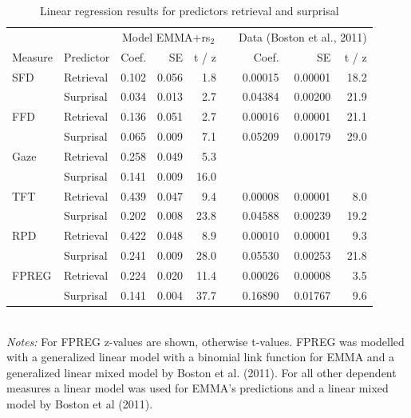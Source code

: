 \begin{subappendices}
\begin{table}
\caption{Linear regression results for predictors retrieval and surprisal} \label{lmtable}
\begin{tabular}{llrrrlrrr}
 & & \multicolumn{3}{c}{Model EMMA+rs$_2$} & & \multicolumn{3}{c}{Data (Boston et al., 2011)}  \\ \cline{3-5} \cline{7-9}
Measure & Predictor & Coef. & SE & t  / z &   & Coef. & SE & t / z \\ 
SFD & Retrieval & 0.102 & 0.056 & 1.8 &   & 0.00015 & 0.00001 & 18.2 \\ 
    & Surprisal & 0.034 & 0.013 & 2.7 &   & 0.04384 & 0.00200 & 21.9 \\ 
  FFD & Retrieval & 0.136 & 0.051 & 2.7 &   & 0.00016 & 0.00001 & 21.1 \\ 
    & Surprisal & 0.065 & 0.009 & 7.1 &   & 0.05209 & 0.00179 & 29.0 \\ 
  Gaze & Retrieval & 0.258 & 0.049 & 5.3 &   &  &  &  \\ 
    & Surprisal & 0.141 & 0.009 & 16.0 &   &  &  &  \\ 
  TFT & Retrieval & 0.439 & 0.047 & 9.4 &   & 0.00008 & 0.00001 & 8.0 \\ 
    & Surprisal & 0.202 & 0.008 & 23.8 &   & 0.04588 & 0.00239 & 19.2 \\ 
  RPD & Retrieval & 0.422 & 0.048 & 8.9 &   & 0.00010 & 0.00001 & 9.3 \\ 
    & Surprisal & 0.241 & 0.009 & 28.0 &   & 0.05530 & 0.00253 & 21.8 \\ 
  FPREG & Retrieval & 0.224 & 0.020 & 11.4 &   & 0.00026 & 0.00008 & 3.5 \\ 
    & Surprisal & 0.141 & 0.004 & 37.7 &   & 0.16890 & 0.01767 & 9.6 \\ 
\end{tabular} \\
{\footnotesize \emph{Notes:} For FPREG z-values are shown, otherwise t-values. FPREG was modelled with a generalized linear model with a binomial link function for EMMA and a generalized linear mixed model by Boston et al. (2011). For all other dependent measures a linear model was used for EMMA's predictions and a linear mixed model by Boston et al (2011).}
\end{table}

\end{subappendices}
